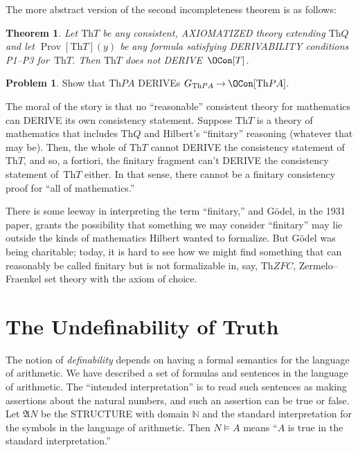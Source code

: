\documentclass[10pt,a4paper]{article}
\newcommand*{\olup}[1]{\MakeUppercase{#1}}
\theoremstyle{plain}
\newtheorem{thm}{Theorem}[section]
\theoremstyle{definition}
\newtheorem{prob}{Problem}[section]
\theoremstyle{remark}
\newenvironment{digress}{}{}
\newcommand*{\olfileid}[3]{}
\newcommand*{\olsection}[1]{\section*{#1}}
\newcommand*{\ollabel}[1]{\label{#1}}
\providecommand{\lif}{\mathbin{\rightarrow}}
\providecommand{\Struct}{\ensuremath{\mathfrak{A}}}
\providecommand{\Sat}[2]{\ensuremath{#1 \models #2}}
\providecommand{\Th}{\ensuremath{\mathrm{Th}}}
\providecommand{\Nat}{\ensuremath{\mathbb{N}}}
\providecommand{\OProv}{\operatorname{Prov}}
\begin{document}
The more abstract version of the second incompleteness theorem is as follows:

\begin{thm}
\ollabel{thm:second-incompleteness-gen} Let $\Th{T}$ be any
consistent, \olup{axiomatized} theory extending $\Th{Q}$ and let
$\OProv[\Th{T}](y)$ be any formula satisfying \olup{derivability} conditions
P1--P3 for~$\Th{T}$. Then $\Th{T}$ does not \olup{derive}~$\OCon[T]$.
\end{thm}

\begin{prob}
Show that $\Th{PA}$ \olup{derive}s $G_{\Th{PA}} \lif \OCon[\Th{PA}]$.
\end{prob}

\begin{digress}
The moral of the story is that no ``reasonable'' consistent theory for
mathematics can \olup{derive} its own consistency statement. Suppose
$\Th{T}$ is a theory of mathematics that includes $\Th{Q}$ and
Hilbert's ``finitary'' reasoning (whatever that may be). Then, the
whole of $\Th{T}$ cannot \olup{derive} the consistency statement of
$\Th{T}$, and so, a fortiori, the finitary fragment can't \olup{derive}
the consistency statement of~$\Th{T}$ either. In that sense, there
cannot be a finitary consistency proof for ``all of mathematics.''

There is some leeway in interpreting the term ``finitary,'' and
G\"odel, in the 1931 paper, grants the possibility that something we
may consider ``finitary'' may lie outside the kinds of mathematics
Hilbert wanted to formalize. But G\"odel was being charitable; today,
it is hard to see how we might find something that can reasonably be
called finitary but is not formalizable in, say, $\Th{ZFC}$,
Zermelo--Fraenkel set theory with the axiom of choice.
\end{digress}





\olfileid{inc}{inp}{tar}

\olsection{The Undefinability of Truth}

The notion of \emph{definability} depends on having a formal semantics
for the language of arithmetic.  We have described a set of formulas
and sentences in the language of arithmetic. The ``intended
interpretation'' is to read such sentences as making assertions about
the natural numbers, and such an assertion can be true or false. Let
$\Struct{N}$ be the \olup{structure} with domain $\Nat$ and the standard
interpretation for the symbols in the language of arithmetic.  Then
$\Sat{N}{A}$ means ``$A$ is true in the standard interpretation.''
\end{document}
